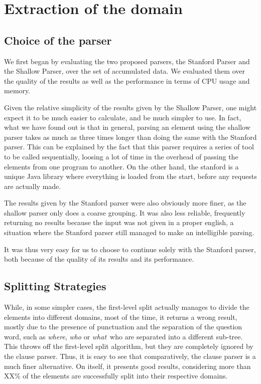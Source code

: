 
\section{Extraction of the domain} %
\label{sec:extraction_of_the_domain}

\subsection{Choice of the parser} %
\label{sub:choice_of_the_parser}

We first began by evaluating the two proposed parsers, the Stanford Parser and the Shallow Parser, over the set of accumulated data. We evaluated them over the quality of the results as well as the performance in terms of CPU usage and memory.

Given the relative simplicity of the results given by the Shallow Parser, one might expect it to be much easier to calculate, and be much simpler to use. In fact, what we have found out is that in general, parsing an element using the shallow parser takes as much as three times longer than doing the same with the Stanford parser. This can be explained by the fact that this parser requires a series of tool to be called sequentially, loosing a lot of time in the overhead of passing the elements from one program to another. On the other hand, the stanford is a unique Java library where everything is loaded from the start, before any requests are actually made.

The results given by the Stanford parser were also obviously more finer, as the shallow parser only does a coarse grouping. It was also less reliable, frequently returning no results because the input was not given in a proper english, a situation where the Stanford parser still managed to make an intelligible parsing.

It was thus very easy for us to choose to continue solely with the Stanford parser, both because of the quality of its results and its performance.


\subsection{Splitting Strategies} %
\label{sub:splitting_strategies}

While, in some simpler cases, the first-level split actually manages to divide the elements into different domains, most of the time, it returns a wrong result, mostly due to the presence of punctuation and the separation of the question word, such as \emph{where}, \emph{who} or \emph{what}\, who are separated into a different sub-tree. This throws off the first-level split algorithm, but they are completely ignored by the clause parser. Thus, it is easy to see that comparatively, the clause parser is a much finer alternative. On itself, it presents good results, considering more than XX\% of the elements are successfully split into their respective domains.

